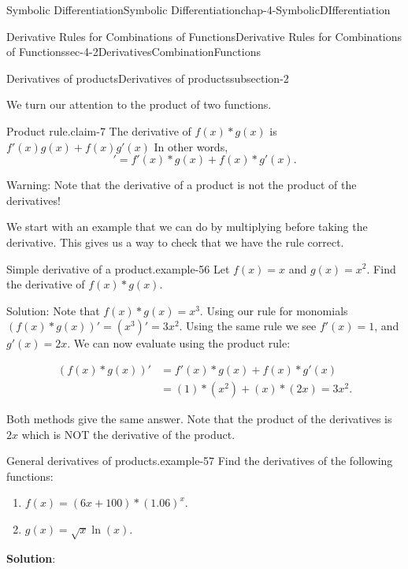 \documentclass[oneside,10pt,]{book}
\newcommand{\terminology}[1]{\textbf{#1}}
\numberwithin{equation}{section}
\newcommand{\amp}{&}
\begin{document}
\begin{chapterptx}{Symbolic Differentiation}{}{Symbolic Differentiation}{}{}{chap-4-SymbolicDIfferentiation}
\begin{sectionptx}{Derivative Rules for Combinations of Functions}{}{Derivative Rules for Combinations of Functions}{}{}{sec-4-2DerivativesCombinationFunctions}
\begin{subsectionptx}{Derivatives of products}{}{Derivatives of products}{}{}{subsection-2}
\begin{introduction}{}
\hypertarget{p-1540}{}%
We turn our attention to the product of two functions.%
\end{introduction}%
\begin{claim}{Product rule.}{}{claim-7}%
\hypertarget{p-1541}{}%
The derivative of \(f(x)* g(x)\) is \(f'(x)g(x)+f(x)g'(x)\)   In other words,%
\begin{equation*}
[f(x)*g(x)]'=f'(x)*g(x)+f(x)*g'(x)\text{.}
\end{equation*}
%
\end{claim}
\hypertarget{p-1542}{}%
Warning: Note that the derivative of a product is not the product of the derivatives!%
\par
\hypertarget{p-1543}{}%
We start with an example that we can do by multiplying before taking the derivative.  This gives us a way to check that we have the rule correct.%
\begin{example}{Simple derivative of a product.}{example-56}%
\hypertarget{p-1544}{}%
Let \(f(x)=x\) and \(g(x)=x^2\).  Find the derivative of \(f(x)*g(x)\).%
\par
\hypertarget{p-1545}{}%
Solution:	Note that \(f(x)*g(x)=x^3\).  Using our rule for monomials \((f(x)*g(x))'=(x^3 )'=3x^2\).  Using the same rule we see \(f'(x)=1\), and \(g'(x)=2x\).  We can now evaluate using the product rule:%
\par
\hypertarget{p-1546}{}%
%
\begin{equation*}
\begin{aligned} (f(x)*g(x))' \amp = f'(x)*g(x)+f(x)*g'(x) \\ 
\amp = (1)*(x^2 )+(x)*(2x)= 3x^2. \end{aligned}
\end{equation*}
%
\end{example}
\hypertarget{p-1547}{}%
Both methods give the same answer.  Note that the product of the derivatives is \(2x\) which is NOT the derivative of the product.%
\begin{example}{General derivatives of products.}{example-57}%
\hypertarget{p-1548}{}%
Find the derivatives of the following functions:%
\leavevmode%
\begin{enumerate}[label=(\alph*)]
\item\hypertarget{li-489}{}\(f(x)=(6x+100)*(1.06)^x.\)%
\item\hypertarget{li-490}{}\(g(x)=\sqrt{x}  \ln(x).\)%
\end{enumerate}
\hypertarget{p-1549}{}%
\terminology{Solution}:%
\leavevmode%
\begin{enumerate}[label=(\alph*)]

\end{enumerate}
\end{example}
\end{subsectionptx}
\end{sectionptx}
\end{chapterptx}
\end{document}
